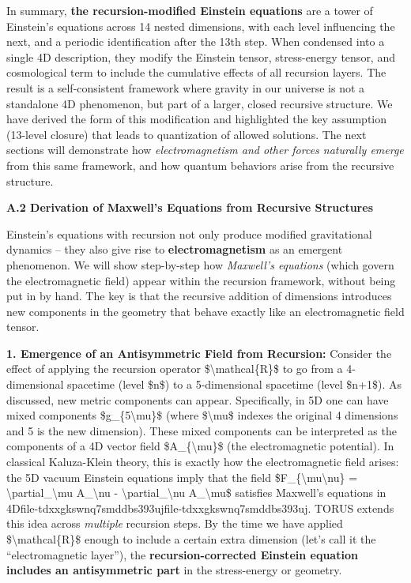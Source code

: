 \documentclass[
]{article}
\begin{document}
In summary, \textbf{the recursion-modified Einstein equations} are a
tower of Einstein's equations across 14 nested dimensions, with each
level influencing the next, and a periodic identification after the 13th
step. When condensed into a single 4D description, they modify the
Einstein tensor, stress-energy tensor, and cosmological term to include
the cumulative effects of all recursion layers\hspace{0pt}. The result
is a self-consistent framework where gravity in our universe is not a
standalone 4D phenomenon, but part of a larger, closed recursive
structure. We have derived the form of this modification and highlighted
the key assumption (13-level closure) that leads to quantization of
allowed solutions. The next sections will demonstrate how
\emph{electromagnetism and other forces naturally emerge} from this same
framework, and how quantum behaviors arise from the recursive structure.

\textbf{A.2 Derivation of Maxwell's Equations from Recursive Structures}

Einstein's equations with recursion not only produce modified
gravitational dynamics -- they also give rise to
\textbf{electromagnetism} as an emergent phenomenon. We will show
step-by-step how \emph{Maxwell's equations} (which govern the
electromagnetic field) appear within the recursion framework, without
being put in by hand. The key is that the recursive addition of
dimensions introduces new components in the geometry that behave exactly
like an electromagnetic field tensor.

\textbf{1. Emergence of an Antisymmetric Field from Recursion:} Consider
the effect of applying the recursion operator
\$\textbackslash mathcal\{R\}\$ to go from a 4-dimensional spacetime
(level \$n\$) to a 5-dimensional spacetime (level \$n+1\$). As
discussed, new metric components can appear. Specifically, in 5D one can
have mixed components \$g\_\{5\textbackslash mu\}\$ (where
\$\textbackslash mu\$ indexes the original 4 dimensions and 5 is the new
dimension). These mixed components can be interpreted as the components
of a 4D vector field \$A\_\{\textbackslash mu\}\$ (the electromagnetic
potential). In classical Kaluza-Klein theory, this is exactly how the
electromagnetic field arises: the 5D vacuum Einstein equations imply
that the field \$F\_\{\textbackslash mu\textbackslash nu\} =
\textbackslash partial\_\textbackslash mu A\_\textbackslash nu -
\textbackslash partial\_\textbackslash nu A\_\textbackslash mu\$
satisfies Maxwell's equations in
4D\hspace{0pt}file-tdxxgkswnq7smddbs393uj\hspace{0pt}file-tdxxgkswnq7smddbs393uj.
TORUS extends this idea across \emph{multiple} recursion steps. By the
time we have applied \$\textbackslash mathcal\{R\}\$ enough to include a
certain extra dimension (let's call it the ``electromagnetic layer''),
the \textbf{recursion-corrected Einstein equation includes an
antisymmetric part} in the stress-energy or geometry.
\end{document}
